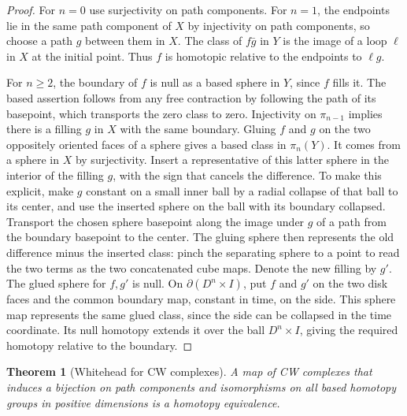 \documentclass[11pt,oneside,openany]{book}
\theoremstyle{plain}
\newtheorem{theorem}{Theorem}[chapter]
\theoremstyle{definition}
\theoremstyle{remark}
\begin{document}
\begin{proof}
For \(n=0\) use surjectivity on path components.
For \(n=1\), the endpoints lie in the same path
component of \(X\) by injectivity on path components,
so choose a path \(g\) between them in \(X\).
The class of \(f\bar g\) in \(Y\) is the image
of a loop \(\ell\) in \(X\) at the initial point.
Thus \(f\) is homotopic relative to the endpoints
to \(\ell g\).

For \(n\ge2\), the boundary of \(f\) is null as a
based sphere in \(Y\), since \(f\) fills it. The
based assertion follows from any free contraction
by following the path of its basepoint, which
transports the zero class to zero. Injectivity on
\(\pi_{n-1}\) implies there is a filling \(g\) in
\(X\) with the same boundary. Gluing \(f\) and
\(g\) on the two oppositely oriented faces of a
sphere gives a based class in \(\pi_n(Y)\). It
comes from a sphere in \(X\) by surjectivity.
Insert a representative of this latter sphere
in the interior of the filling \(g\), with the
sign that cancels the difference. To make this
explicit, make \(g\) constant on a small inner
ball by a radial collapse of that ball to its
center, and use the inserted sphere on the ball
with its boundary collapsed. Transport the chosen
sphere basepoint along the image under \(g\) of
a path from the boundary basepoint to the center.
The gluing sphere then represents the old difference
minus the inserted class: pinch the separating
sphere to a point to read the two terms as the
two concatenated cube maps. Denote the new
filling by \(g'\). The glued sphere for \(f,g'\)
is null. On \(\partial(D^n\times I)\), put \(f\)
and \(g'\) on the two disk faces and the common
boundary map, constant in time, on the side.
This sphere map represents the same glued class,
since the side can be collapsed in the time
coordinate. Its null homotopy extends it over
the ball \(D^n\times I\), giving the required
homotopy relative to the boundary.
\end{proof}

\begin{theorem}[Whitehead for CW complexes]
\label{thm:p202-whitehead}
A map of CW complexes that induces a bijection on
path components and isomorphisms on all based
homotopy groups in positive dimensions is a
homotopy equivalence.
\end{theorem}
\end{document}
